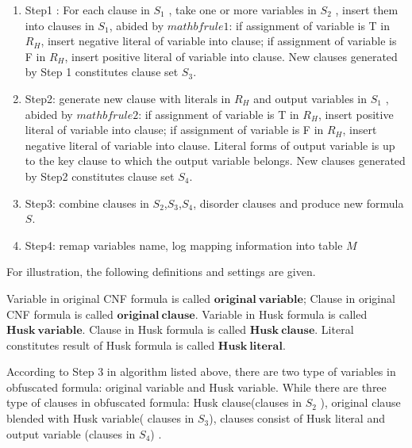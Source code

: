 \documentclass[runningheads,a4paper]{llncs}
\begin{document}
\begin{enumerate}
\item Step1 : For each clause in $S_1$  , take one or more variables in $S_2$ , insert them into clauses in $S_1$, abided by $mathbf{rule 1}$:
if assignment of variable is T in $R_H$, insert negative literal of variable into clause;
if assignment of variable is F in $R_H$, insert positive literal of variable into clause. 
New clauses generated by Step 1 constitutes clause set $S_3$.
\item Step2: generate new clause with literals in $R_H$ and output variables in $S_1$ , abided by $mathbf{rule 2}$: 
if assignment of variable is T in $R_H$, insert positive literal of variable into clause;
if assignment of variable is F in $R_H$, insert negative literal of variable into clause.
Literal forms of output variable is up to the key clause to which the output variable belongs. 
New clauses generated by Step2 constitutes clause set $S_4$.
\item Step3: combine clauses in $S_2$,$S_3$,$S_4$, disorder clauses and produce new formula $S$.
\item Step4: remap variables name, log mapping information into table $M$ 
\end{enumerate}

For illustration, the following definitions and settings are given.



\begin{definition}
Variable in original CNF formula is called $\mathbf{original~variable}$;
Clause in original CNF formula is called $\mathbf{original~clause}$. 
Variable in Husk formula is called $\mathbf{Husk~variable}$.
Clause in Husk formula is called $\mathbf{Husk~clause}$. 
Literal constitutes result of Husk formula is called $\mathbf{Husk~literal}$.
\end{definition}


According to Step 3 in algorithm listed above, there are two type of variables in obfuscated formula: original variable and Husk variable. 
While there are three type of clauses in obfuscated formula: Husk clause(clauses in $S_2$ ),
original clause blended with Husk variable( clauses in $S_3$),
clauses consist of Husk literal and output variable (clauses in $S_4$) .
\end{document}
